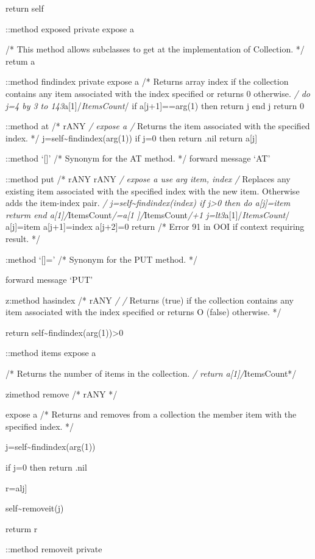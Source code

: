 return self

::method exposed private expose a

/* This method allows subclasses to get at the implementation of
Collection. */ retum a

::method findindex private expose a /* Returns array index if the
collection contains any item associated with the index specified or
returns 0 otherwise. \emph{/ do j=4 by 3 to
143}a{[}1{]}/\emph{ItemsCount}/ if a{[}j+1{]}==arg(1) then return j end
j return 0

::method at /* rANY \emph{/ expose a /} Returns the item associated with
the specified index. */ j=self\textasciitilde findindex(arg(1)) if j=0
then return .nil return a{[}j{]}

::method `{[}{]}' /* Synonym for the AT method. */ forward message `AT'

::method put /* rANY rANY \emph{/ expose a use arg item, index /}
Replaces any existing item associated with the specified index with the
new item. Otherwise adds the item-index pair. \emph{/
j=self\textasciitilde findindex(index) if j\textgreater0 then do
a{[}j{]}=item returm end a{[}1{]}/}ItemsCount\emph{/=a{[}1
{]}/}ItemsCount\emph{/+1 j=lt3}a{[}1{]}/\emph{ItemsCount}/ a{[}j{]}=item
a{[}j+1{]}=index a{[}j+2{]}=0 return /* Error 91 in OOI if context
requiring result. */

:method `{[}{]}=' /* Synonym for the PUT method. */

forward message `PUT'

z:method hasindex /* rANY \emph{/ /} Returns \textbar{} (true) if the
collection contains any item associated with the index specified or
returns O (false) otherwise. */

return self\textasciitilde findindex(arg(1))\textgreater0

::method items expose a

/* Returns the number of items in the collection. \emph{/ return
a{[}1{]}/}ItemsCount*/

zimethod remove /* rANY */

expose a /* Returns and removes from a collection the member item with
the specified index. */

j=self\textasciitilde findindex(arg(1))

if j=0 then return .nil

r=alj{]}

self\textasciitilde removeit(j)

returm r

::method removeit private

